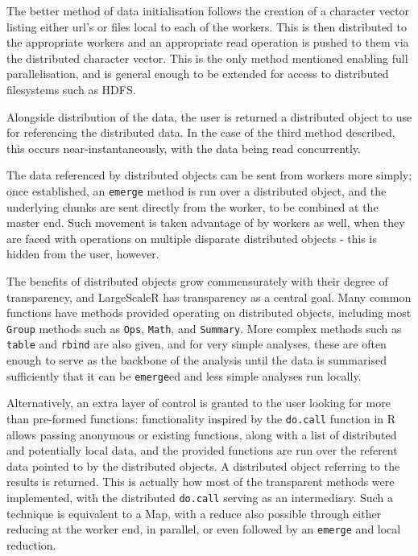 The better method of data initialisation follows the creation of a character vector listing either url's or files local to each of the workers.
This is then distributed to the appropriate workers and an appropriate read operation is pushed to them via the distributed character vector.
This is the only method mentioned enabling full parallelisation, and is general enough to be extended for access to distributed filesystems such as HDFS.

Alongside distribution of the data, the user is returned a distributed object to use for referencing the distributed data.
In the case of the third method described, this occurs near-instantaneously, with the data being read concurrently.

The data referenced by distributed objects can be sent from workers more simply; once established, an \texttt{emerge} method is run over a distributed object, and the underlying chunks are sent directly from the worker, to be combined at the master end.
Such movement is taken advantage of by workers as well, when they are faced with operations on multiple disparate distributed objects - this is hidden from the user, however.

The benefits of distributed objects grow commensurately with their degree of transparency, and LargeScaleR has transparency as a central goal.
Many common functions have methods provided operating on distributed objects, including most \texttt{Group} methods such as \texttt{Ops}, \texttt{Math}, and \texttt{Summary}.
More complex methods such as \texttt{table} and \texttt{rbind} are also given, and for very simple analyses, these are often enough to serve as the backbone of the analysis until the data is summarised sufficiently that it can be \texttt{emerge}ed and less simple analyses run locally.

Alternatively, an extra layer of control is granted to the user looking for more than pre-formed functions:
functionality inspired by the \texttt{do.call} function in R allows passing anonymous or existing functions, along with a list of distributed and potentially local data, and the provided functions are run over the referent data pointed to by the distributed objects.
A distributed object referring to the results is returned.
This is actually how most of the transparent methods were implemented, with the distributed \texttt{do.call} serving as an intermediary.
Such a technique is equivalent to a Map, with a reduce also possible through either reducing at the worker end, in parallel, or even followed by an \texttt{emerge} and local reduction.

